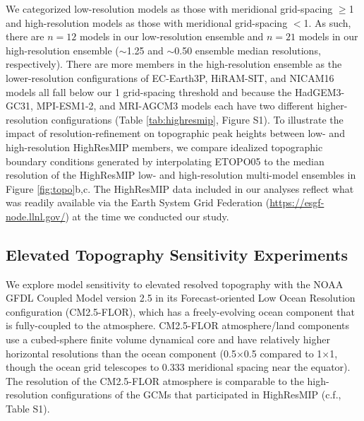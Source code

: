 \documentclass[draft]{agujournal2019}
\begin{document}
We categorized low-resolution models as those with meridional grid-spacing $\geq$1\textdegree{} and high-resolution models as those with meridional grid-spacing $<$1\textdegree{}. As such, there are $n=12$ models in our low-resolution ensemble and $n=21$ models in our high-resolution ensemble ($\sim$1.25\textdegree{} and $\sim$0.50\textdegree{} ensemble median resolutions, respectively). There are more members in the high-resolution ensemble as the lower-resolution configurations of EC-Earth3P, HiRAM-SIT, and NICAM16 models all fall below our 1\textdegree{} grid-spacing threshold and because the HadGEM3-GC31, MPI-ESM1-2, and MRI-AGCM3 models each have two different higher-resolution configurations (Table \ref{tab:highresmip}, Figure S1). To illustrate the impact of resolution-refinement on topographic peak heights between low- and high-resolution HighResMIP members, we compare idealized topographic boundary conditions generated by interpolating ETOPO05 to the median resolution of the HighResMIP low- and high-resolution multi-model ensembles in Figure \ref{fig:topo}b,c. The HighResMIP data included in our analyses reflect what was readily available via the Earth System Grid Federation (\url{https://esgf-node.llnl.gov/}) at the time we conducted our study. 


\subsection{Elevated Topography Sensitivity Experiments}
We explore model sensitivity to elevated resolved topography with the NOAA GFDL Coupled Model version 2.5 in its Forecast-oriented Low Ocean Resolution configuration (CM2.5-FLOR), which has a freely-evolving ocean component that is fully-coupled to the atmosphere. CM2.5-FLOR atmosphere/land components use a cubed-sphere finite volume dynamical core and have relatively higher horizontal resolutions than the ocean component (0.5\textdegree{}$\times$0.5\textdegree{} compared to 1\textdegree{}$\times$1\textdegree{}, though the ocean grid telescopes to 0.333\textdegree{} meridional spacing near the equator). The resolution of the CM2.5-FLOR atmosphere is comparable to the high-resolution configurations of the GCMs that participated in HighResMIP (c.f., Table S1). 
\end{document}

